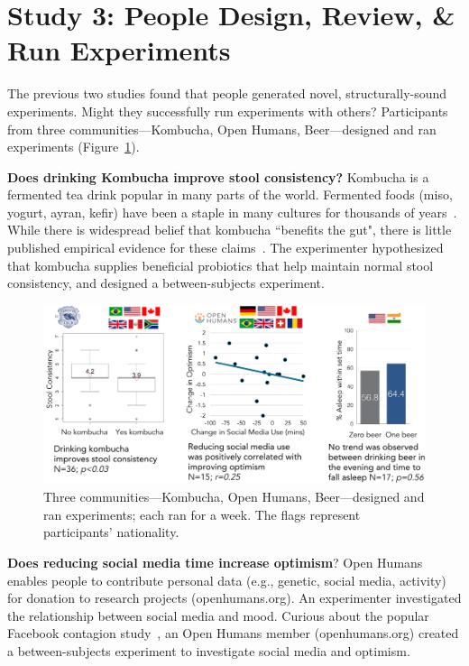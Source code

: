 \section{Study 3: People Design, Review, \& Run Experiments}
The previous two studies found that people generated novel, structurally-sound experiments. Might they successfully run experiments with others? Participants from three communities---Kombucha, Open Humans, Beer---designed and ran experiments (Figure~\ref{fig:galileo-result3}).  

\textbf{Does drinking Kombucha improve stool consistency?} Kombucha is a fermented tea drink popular in many parts of the world. Fermented foods (miso, yogurt, ayran, kefir) have been a staple in many cultures for thousands of years~\cite{Chilton2015}. While there is widespread belief that kombucha ``benefits the gut", there is little published empirical evidence for these claims~\cite{Ernst2003}. The experimenter hypothesized that kombucha supplies beneficial probiotics that help maintain normal stool consistency, and designed a between-subjects experiment.

\begin{figure}[h] 
\centering
  \includegraphics[width=1.0\textwidth]{figures/galileo/galileo-study3}
  \caption[Three communities---Kombucha, Open Humans, Beer---designed and ran experiments]
{Three communities---Kombucha, Open Humans, Beer---designed and ran experiments; each ran for a week. The flags represent participants' nationality. }
  \label{fig:galileo-result3}
\end{figure}

\textbf{Does reducing social media time increase optimism}? Open Humans enables people to contribute personal data (e.g., genetic, social media, activity) for donation to research projects (openhumans.org). An experimenter investigated the relationship between social media and mood. Curious about the popular Facebook contagion study~\cite{Coviello2014}, an Open Humans member (openhumans.org) created a between-subjects experiment to investigate social media and optimism.

